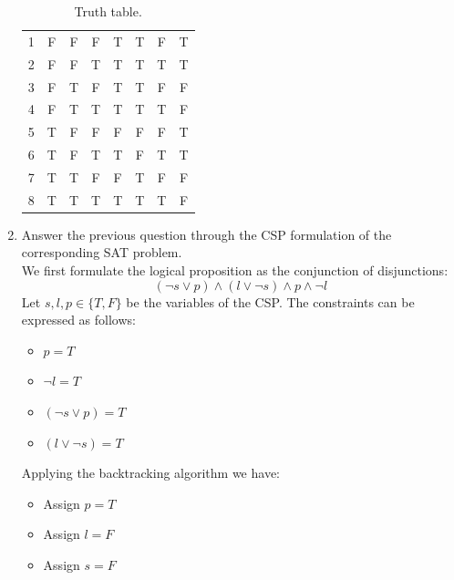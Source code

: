 \documentclass[9pt,a4paper]{extarticle}
\newenvironment{solution}
    {%
    \color{red}
    }
    { 
    \color{black}
    }
\begin{document}
\begin{enumerate}
\begin{solution}
\begin{table}[H]
\begin{tabular}{|l|ccc|cccc|}
             1 & F & F & F & T & T & F & T\\
             2 & F & F & T & T & T & T & T\\
             3 & F & T & F & T & T & F & F\\
             4 & F & T & T & T & T & T & F\\
             5 & T & F & F & F & F & F & T\\
             6 & T & F & T & T & F & T & T\\
             7 & T & T & F & F & T & F & F\\
             8 & T & T & T & T & T & T & F\\  \hline
             
         \end{tabular}
         \caption{Truth table.}
         \label{tab:my_label}
     \end{table}
     \end{solution}
     \item Answer the previous question through the CSP formulation of the corresponding SAT problem.
     \begin{solution}\\
     We first formulate the logical proposition as the conjunction of disjunctions:
    $$ (\lnot s \lor p) \land (l \lor \lnot s) \land p \land \lnot l$$
    Let $s, l, p \in \{T, F\}$ be the variables of the CSP. The constraints can be expressed as follows:
    \begin{itemize}
        \item $p = T$
        \item $\lnot l = T$
        \item $(\lnot s \lor p) = T$
        \item $(l \lor \lnot s) = T$
    \end{itemize}
    Applying the backtracking algorithm we have:
    \begin{itemize}
        \item Assign $p = T$
        \item Assign $l = F$
        \item Assign $s = F$
    \end{itemize}
     \end{solution}
 \end{enumerate}
\end{document}
